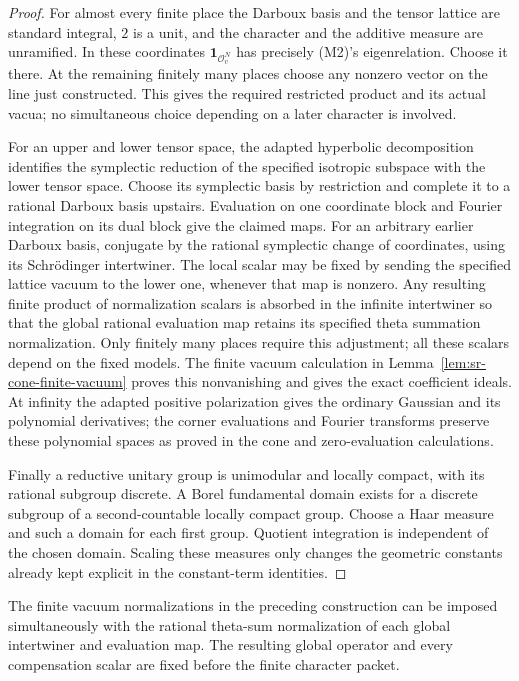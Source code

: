 \begin{proof}
For almost every finite place the Darboux basis and the tensor
lattice are standard integral, \(2\) is a unit, and the character
and the additive measure are unramified. In these coordinates
\(\mathbf1_{\mathcal O_v^N}\) has precisely (M2)'s eigenrelation.
Choose it there. At the remaining finitely many places choose
any nonzero vector on the line just constructed. This gives
the required restricted product and its actual vacua; no
simultaneous choice depending on a later character is involved.

For an upper and lower tensor space, the adapted hyperbolic
decomposition identifies the symplectic reduction of the
specified isotropic subspace with the lower tensor space.
Choose its symplectic basis by restriction and complete it to
a rational Darboux basis upstairs. Evaluation on one coordinate
block and Fourier integration on its dual block give the
claimed maps. For an arbitrary earlier Darboux basis, conjugate
by the rational symplectic change of coordinates, using its
Schr\"odinger intertwiner. The local scalar may be fixed by sending
the specified lattice vacuum to the lower one, whenever that
map is nonzero. Any resulting finite product of normalization
scalars is absorbed in the infinite intertwiner so that the
global rational evaluation map retains its specified theta
summation normalization. Only finitely many places require
this adjustment; all these scalars depend on the fixed models.
The finite vacuum calculation in
Lemma~\ref{lem:sr-cone-finite-vacuum} proves this nonvanishing
and gives the exact coefficient ideals. At infinity the
adapted positive polarization gives the ordinary Gaussian
and its polynomial derivatives; the corner evaluations and
Fourier transforms preserve these polynomial spaces as proved
in the cone and zero-evaluation calculations.

Finally a reductive unitary group is unimodular and locally
compact, with its rational subgroup discrete.
A Borel fundamental domain exists for a discrete subgroup of
a second-countable locally compact group. Choose a Haar
measure and such a domain for each first group. Quotient
integration is independent of the chosen domain. Scaling
these measures only changes the geometric constants already
kept explicit in the constant-term identities.
\end{proof}

\begin{srlemma}
\label{lem:sr-theta-rational-normalization}
The finite vacuum normalizations in the preceding construction
can be imposed simultaneously with the rational theta-sum
normalization of each global intertwiner and evaluation map.
The resulting global operator and every compensation scalar
are fixed before the finite character packet.
\end{srlemma}

